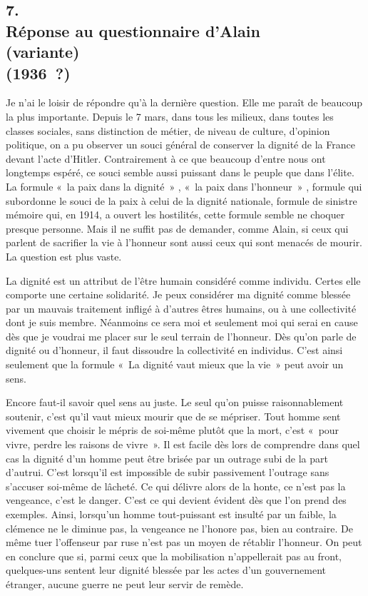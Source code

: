 \documentclass[french,twoside]{book} %
\begin{document}
\subsection[{7. Réponse au questionnaire d'Alain, (variante) (1936 ?)}]{7. \\
Réponse au questionnaire d'Alain \\
(variante) \\
(1936 ?)}
\noindent \par
Je n'ai le loisir de répondre qu'à la dernière question. Elle me paraît de beaucoup la plus importante. Depuis le 7 mars, dans tous les milieux, dans toutes les classes sociales, sans distinction de métier, de niveau de culture, d'opinion politique, on a pu observer un souci général de conserver la dignité de la France devant l'acte d'Hitler. Contrairement à ce que beaucoup d'entre nous ont longtemps espéré, ce souci semble aussi puissant dans le peuple que dans l'élite. La formule « la paix dans la dignité » , « la paix dans l'honneur » , formule qui subordonne le souci de la paix à celui de la dignité nationale, formule de sinistre mémoire qui, en 1914, a ouvert les hostilités, cette formule semble ne choquer presque personne. Mais il ne suffit pas de demander, comme Alain, si ceux qui parlent de sacrifier la vie à l'honneur sont aussi ceux qui sont menacés de mourir. La question est plus vaste.\par
La dignité est un attribut de l'être humain considéré comme individu. Certes elle comporte une certaine solidarité. Je peux considérer ma dignité comme blessée par un mauvais traitement infligé à d'autres êtres humains, ou à une collectivité dont je suis membre. Néanmoins ce sera moi et seulement moi qui serai en cause dès que je voudrai me placer sur le seul terrain de l'honneur. Dès qu'on parle de dignité ou d'honneur, il faut dissoudre la collectivité en individus. C'est ainsi seulement que la formule « La dignité vaut mieux que la vie » peut avoir un sens.\par
Encore faut-il savoir quel sens au juste. Le seul qu'on puisse raisonna­blement soutenir, c'est qu'il vaut mieux mourir que de se mépriser. Tout homme sent vivement que choisir le mépris de soi-même plutôt que la mort, c'est « pour vivre, perdre les raisons de vivre ». Il est facile dès lors de comprendre dans quel cas la dignité d'un homme peut être brisée par un outrage subi de la part d'autrui. C'est lorsqu'il est impossible de subir passivement l'outrage sans s'accuser soi-même de lâcheté. Ce qui délivre alors de la honte, ce n'est pas la vengeance, c'est le danger. C'est ce qui devient évident dès que l'on prend des exemples. Ainsi, lorsqu'un homme tout-puissant est insulté par un faible, la clémence ne le diminue pas, la vengeance ne l'honore pas, bien au contraire. De même tuer l'offenseur par ruse n'est pas un moyen de rétablir l'honneur. On peut en conclure que si, parmi ceux que la mobilisation n'appellerait pas au front, quelques-uns sentent leur dignité blessée par les actes d'un gouvernement étranger, aucune guerre ne peut leur servir de remède.\par
\end{document}
